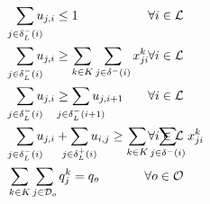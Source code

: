 \documentclass{article}
\begin{document}
\begin{alignat}{3}
    \label{mod:c22}        & \hspace{2mm} \smashoperator{ \sum_{ j \in \delta^{-}_{L}(i)}}{u_{j,i } } \leq 1                                                                                                                                                                                                                  & \hspace{-20mm} \forall i \in \mathcal{L}                                                         \\
    \label{mod:c230}       & \hspace{2mm} \smashoperator{ \sum_{ j \in \delta^{-}_{L}(i)}}{u_{j,i } }  \geq \sum_{k \in K}\sum_{j \in  \delta^{-}(i) }{x^k_{ji}}                                                                                                                                                              & \hspace{-20mm} \forall i \in \mathcal{L}                                                         \\
    \label{mod:c231}       & \hspace{2mm} \smashoperator{ \sum_{ j \in \delta^{-}_{L}(i)}}{u_{j,i } } \geq \smashoperator{ \sum_{ j \in \delta^{-}_{L}(i+1)}}{u_{j,i+1 } }                                                                                                                                                    & \hspace{-20mm} \forall i \in \mathcal{L}                                                         \\
    \label{mod:c23}        & \hspace{2mm} \smashoperator{ \sum_{ j \in \delta^{-}_{L}(i)}}{u_{j,i } } + \smashoperator{ \sum_{ j \in \delta^{+}_{L}(i)}}{u_{i,j } } \geq \sum_{k \in K}\sum_{j \in  \delta^{-}(i) }{x^k_{ji}}                                                                                                 & \hspace{-20mm} \forall i \in \mathcal{L}                                                         \\
    \label{mod:c24}        & \sum_{k \in K}\sum_{j \in \mathcal{D}_o}{q^k_j} = q_o                                                                                                                                                                                                                                            & \hspace{-20mm}  \forall o \in \mathcal{O}                                                        \\

\end{alignat}
\end{document}
